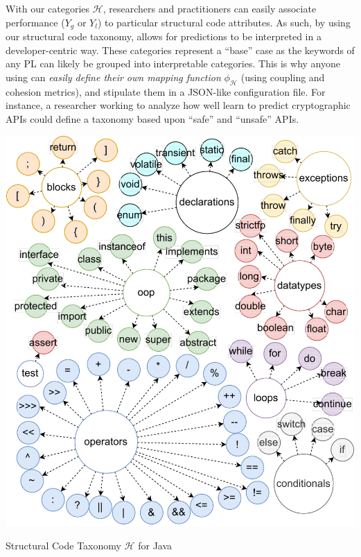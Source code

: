 With our categories $\mathcal{H}$, researchers and practitioners can easily associate \nlm performance (\ie $Y_g$ or $Y_l$) to particular structural code attributes. As such, by using our structural code taxonomy, \codegen allows for \nlm predictions to be interpreted in a developer-centric way. These categories represent a “base” case as the keywords of any PL can likely be grouped into interpretable categories. This is why anyone using \codegen can \textit{easily define their own mapping function} $\phi_{\mathcal{H}}$ (\eg using coupling and cohesion metrics), and stipulate them in a JSON-like configuration file. For instance, a researcher working to analyze how well \nlms learn to predict cryptographic APIs could define a taxonomy based upon “safe” and “unsafe” APIs.

 \begin{marginfigure}
		\centering
		\includegraphics[width=\textwidth]{graphics/preliminaries/fig_3_taxonomy.pdf}
		\caption{Structural Code Taxonomy $\mathcal{H}$ for Java}
        \label{fig:taxonomy}
\end{marginfigure}

